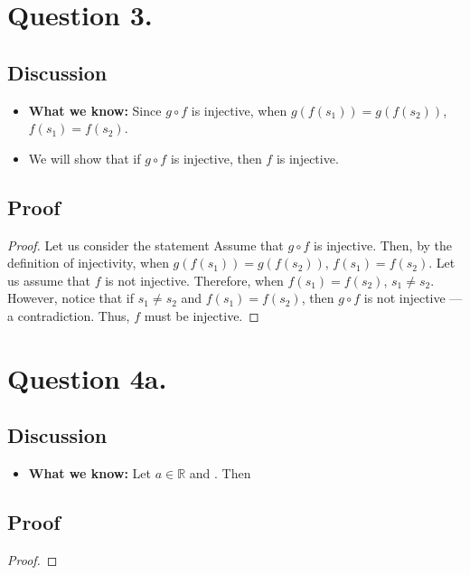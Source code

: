 \documentclass{article}
\begin{document}
\section*{Question 3.}
\subsection*{Discussion}
\begin{itemize}
    \item \textbf{What we know:} Since $ g \circ f $ is injective, when $ g(f(s_1)) = g(f(s_2)) $, $ f(s_1) = f(s_2) $.
    \item We will show that if $ g \circ f $ is injective, then $ f $ is injective.
\end{itemize}

\subsection*{Proof}
\begin{proof}
    Let us consider the statement  Assume that $ g \circ f $ is injective. Then, by the definition of injectivity, when $ g(f(s_1)) = g(f(s_2)) $, $ f(s_1) = f(s_2) $. Let us assume
    that $ f $ is not injective. Therefore, when $ f(s_1) = f(s_2) $, $ s_1 \neq s_2 $. However, notice that if $ s_1 \neq s_2 $ and $ f(s_1) = f(s_2) $, then $ g \circ f $ is not injective --- a contradiction. Thus, $ f $ must be injective.
\end{proof}

\section*{Question 4a.}
\subsection*{Discussion}
\begin{itemize}
    \item \textbf{What we know:} Let $ a \in \mathbb{R} $ and $$. Then 
\end{itemize}

\subsection*{Proof}
\begin{proof}
    
\end{proof}
\end{document}
